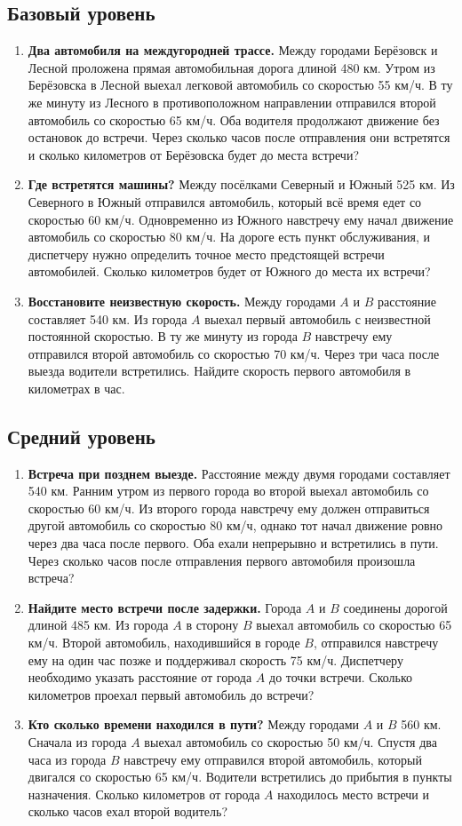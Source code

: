\documentclass[a4paper,11pt]{article}
\newcommand{\qtask}[2]{\needspace{7\baselineskip}\item \textbf{#1} #2}
\begin{document}
\subsection*{Базовый уровень}
\begin{enumerate}[label=\textbf{\arabic*.},leftmargin=*,itemsep=13pt]
\qtask{Два автомобиля на междугородней трассе.}{
Между городами Берёзовск и Лесной проложена прямая автомобильная дорога длиной 480 км. Утром из Берёзовска в Лесной выехал легковой автомобиль со скоростью 55 км/ч. В ту же минуту из Лесного в противоположном направлении отправился второй автомобиль со скоростью 65 км/ч. Оба водителя продолжают движение без остановок до встречи. Через сколько часов после отправления они встретятся и сколько километров от Берёзовска будет до места встречи?}
\qtask{Где встретятся машины?}{
Между посёлками Северный и Южный 525 км. Из Северного в Южный отправился автомобиль, который всё время едет со скоростью 60 км/ч. Одновременно из Южного навстречу ему начал движение автомобиль со скоростью 80 км/ч. На дороге есть пункт обслуживания, и диспетчеру нужно определить точное место предстоящей встречи автомобилей. Сколько километров будет от Южного до места их встречи?}
\qtask{Восстановите неизвестную скорость.}{
Между городами $A$ и $B$ расстояние составляет 540 км. Из города $A$ выехал первый автомобиль с неизвестной постоянной скоростью. В ту же минуту из города $B$ навстречу ему отправился второй автомобиль со скоростью 70 км/ч. Через три часа после выезда водители встретились. Найдите скорость первого автомобиля в километрах в час.}
\end{enumerate}
\clearpage
\subsection*{Средний уровень}
\begin{enumerate}[label=\textbf{\arabic*.},leftmargin=*,start=4,itemsep=13pt]
\qtask{Встреча при позднем выезде.}{
Расстояние между двумя городами составляет 540 км. Ранним утром из первого города во второй выехал автомобиль со скоростью 60 км/ч. Из второго города навстречу ему должен отправиться другой автомобиль со скоростью 80 км/ч, однако тот начал движение ровно через два часа после первого. Оба ехали непрерывно и встретились в пути. Через сколько часов после отправления первого автомобиля произошла встреча?}
\qtask{Найдите место встречи после задержки.}{
Города $A$ и $B$ соединены дорогой длиной 485 км. Из города $A$ в сторону $B$ выехал автомобиль со скоростью 65 км/ч. Второй автомобиль, находившийся в городе $B$, отправился навстречу ему на один час позже и поддерживал скорость 75 км/ч. Диспетчеру необходимо указать расстояние от города $A$ до точки встречи. Сколько километров проехал первый автомобиль до встречи?}
\qtask{Кто сколько времени находился в пути?}{
Между городами $A$ и $B$ 560 км. Сначала из города $A$ выехал автомобиль со скоростью 50 км/ч. Спустя два часа из города $B$ навстречу ему отправился второй автомобиль, который двигался со скоростью 65 км/ч. Водители встретились до прибытия в пункты назначения. Сколько километров от города $A$ находилось место встречи и сколько часов ехал второй водитель?}
\end{enumerate}
\clearpage
\end{document}
